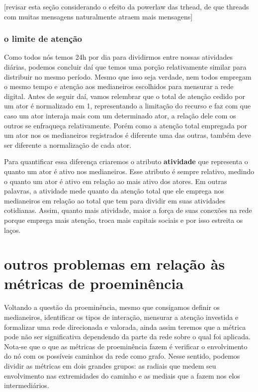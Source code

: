 \documentclass{article}
\begin{document}
[revisar esta seção considerando o efeito da powerlaw das trhead, de que
threads com muitas mensagens naturalmente atraem mais mensagens]

\subsubsection{o limite de atenção}

Como todos nós temos 24h por dia para dividirmos entre nossas atividades
diárias, podemos concluir daí que temos uma porção relativamente similar para
distribuir no mesmo período. Mesmo que isso seja verdade, nem todos empregam o
mesmo tempo e atenção aos medianeiros escolhidos para mensurar a rede digital.
Antes de seguir daí, vamos relembrar que o total de atenção cedido por um
ator é normalizado em 1, representando a limitação do recurso e faz com que
caso um ator interaja mais com um determinado ator, a relação dele com os outros
se enfraqueça relativamente. Porém como a atenção total empregada por um ator
nos os medianeiros registrados é diferente uma das outras, também deve ser
diferente a normalização de cada ator.

Para quantificar essa diferença criaremos o atributo \textbf{atividade} que
representa o quanto um ator é ativo nos medianeiros. Esse atributo é sempre
relativo, medindo o quanto um ator é ativo em relação ao mais ativo dos
atores. Em outras palavras, a atividade mede quanto da atenção total que ele
emprega nos medianeiros em relação ao total que tem para dividir em suas
atividades cotidianas. Assim, quanto mais atividade, maior a força de suas
conexões na rede porque emprega mais atenção, troca mais capitais sociais e por
isso estreita os laços.

\section{outros problemas em relação às métricas de proeminência}

Voltando a questão da proeminência, mesmo que consigamos definir os medianeiros,
identificar os tipos de interação, mensurar a atenção investida e formalizar uma
rede direcionada e valorada, ainda assim teremos que a métrica pode não ser
significativa dependendo da parte da rede sobre o qual foi aplicada. Nota-se que
o que as métricas de proeminência fazem é verificar o envolvimento do nó com os
possíveis caminhos da rede como grafo. Nesse sentido, podemos dividir as
métricas em dois grandes grupos: as radiais que medem seu envolvimento nas
extremidades do caminho e as mediais que a fazem nos elos intermediários.
\end{document}
